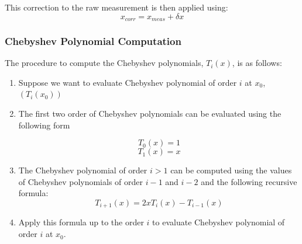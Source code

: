 This correction to the raw measurement is then applied using:
\begin{equation}
x_{corr} = x_{meas} + \delta x
\end{equation}

\subsubsection{Chebyshev Polynomial Computation\cite{Chebyshev}}
The procedure to compute the Chebyshev polynomials, $T_i(x)$, is as follows:
\begin{enumerate}
\item Suppose we want to evaluate Chebyshev polynomial of order $i$ at $x_0$, $(T_i(x_0))$
\item The first two order of Chebyshev polynomials can be evaluated using the following form

\begin{equation}
T_0(x) = 1 
\end{equation}
\begin{equation}
T_1(x) = x
\end{equation}

\item The Chebyshev polynomial of order $i > 1$ can be computed using the values of Chebyshev polynomials of order $i-1$ and $i-2$ and the following recursive formula:
\begin{equation}
T_{i+1}(x) = 2xT_i(x) - T_{i-1}(x)
\end{equation}
\item Apply this formula up to the order $i$ to evaluate Chebyshev polynomial of order $i$ at $x_0$. 
\end{enumerate}





